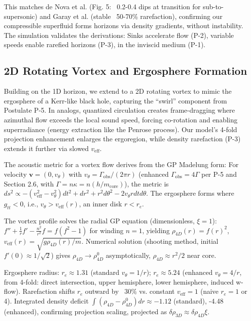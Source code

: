 \documentclass{article}
\begin{document}
This matches de Nova et al. (Fig. 5: ~0.2-0.4 dips at transition for sub-to-supersonic) and Garay et al. (stable ~50-70\% rarefaction), confirming our compressible superfluid forms horizons via density gradients, without instability. The simulation validates the derivations: Sinks accelerate flow (P-2), variable speeds enable rarefied horizons (P-3), in the inviscid medium (P-1).

\subsection{2D Rotating Vortex and Ergosphere Formation}

Building on the 1D horizon, we extend to a 2D rotating vortex to mimic the ergosphere of a Kerr-like black hole, capturing the ``swirl'' component from Postulate P-5. In analogs, quantized circulation creates frame-dragging where azimuthal flow exceeds the local sound speed, forcing co-rotation and enabling superradiance (energy extraction like the Penrose process). Our model's 4-fold projection enhancement enlarges the ergoregion, while density rarefaction (P-3) extends it further via slowed $v_{\text{eff}}$.

The acoustic metric for a vortex flow derives from the GP Madelung form: For velocity $\mathbf{v} = (0, v_\theta)$ with $v_\theta = \Gamma_{\text{obs}} / (2\pi r)$ (enhanced $\Gamma_{\text{obs}} = 4 \Gamma$ per P-5 and Section 2.6, with $\Gamma = n \kappa = n (h / m_{\text{core}})$), the metric is $ds^2 \propto - (v_{\text{eff}}^2 - v_\theta^2) dt^2 + dr^2 + r^2 d\theta^2 - 2 v_\theta r dt d\theta$. The ergosphere forms where $g_{tt} < 0$, i.e., $v_\theta > v_{\text{eff}}(r)$, an inner disk $r < r_e$.

The vortex profile solves the radial GP equation (dimensionless, $\xi = 1$): $f'' + \frac{1}{r} f' - \frac{n^2}{r^2} f = f (f^2 - 1)$ for winding $n=1$, yielding $\rho_{4D}(r) = f(r)^2$, $v_{\text{eff}}(r) = \sqrt{g \rho_{4D}(r) / m}$. Numerical solution (shooting method, initial $f'(0) \approx 1/\sqrt{2}$) gives $\rho_{4D} \to \rho_{4D}^0$ asymptotically, $\rho_{4D} \approx r^2 / 2$ near core.

Ergosphere radius: $r_e \approx 1.31$ (standard $v_\theta = 1/r$); $r_e \approx 5.24$ (enhanced $v_\theta = 4/r$, from 4-fold: direct intersection, upper hemisphere, lower hemisphere, induced w-flow). Rarefaction shifts $r_e$ outward by ~30\% vs. constant $v_{\text{eff}}=1$ (naive $r_e=1$ or 4). Integrated density deficit $\int (\rho_{4D} - \rho_{4D}^0) dr \approx -1.12$ (standard), -4.48 (enhanced), confirming projection scaling, projected as $\delta \rho_{3D} \approx \delta \rho_{4D} \xi$.
\end{document}
